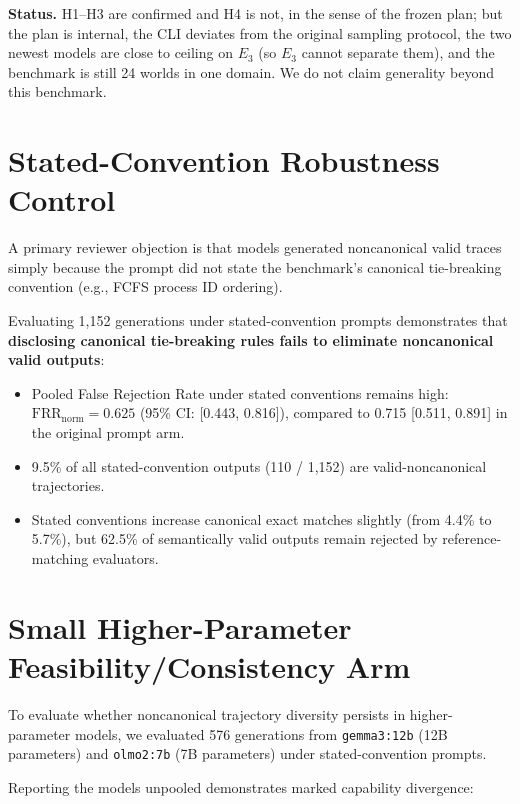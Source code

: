 \documentclass[11pt]{article}
\begin{document}
\textbf{Status.} H1--H3 are confirmed and H4 is not, in the sense of the frozen plan; but the plan is internal, the CLI deviates from the original sampling protocol, the two newest models are close to ceiling on $E_3$ (so $E_3$ cannot separate them), and the benchmark is still 24 worlds in one domain. We do not claim generality beyond this benchmark.

\section{Stated-Convention Robustness Control}
A primary reviewer objection is that models generated noncanonical valid traces simply because the prompt did not state the benchmark's canonical tie-breaking convention (e.g., FCFS process ID ordering).

Evaluating 1,152 generations under stated-convention prompts demonstrates that \textbf{disclosing canonical tie-breaking rules fails to eliminate noncanonical valid outputs}:

\begin{itemize}
\item Pooled False Rejection Rate under stated conventions remains high: $\text{FRR}_{\text{norm}} = 0.625$ (95\% CI: [0.443, 0.816]), compared to 0.715 [0.511, 0.891] in the original prompt arm.
\item 9.5\% of all stated-convention outputs (110 / 1,152) are valid-noncanonical trajectories.
\item Stated conventions increase canonical exact matches slightly (from 4.4\% to 5.7\%), but 62.5\% of semantically valid outputs remain rejected by reference-matching evaluators.
\end{itemize}
\section{Small Higher-Parameter Feasibility/Consistency Arm}
To evaluate whether noncanonical trajectory diversity persists in higher-parameter models, we evaluated 576 generations from \texttt{gemma3:12b} (12B parameters) and \texttt{olmo2:7b} (7B parameters) under stated-convention prompts.

Reporting the models unpooled demonstrates marked capability divergence:
\end{document}

